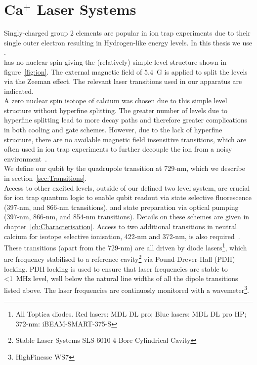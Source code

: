 \section{Ca$^+$ Laser Systems}	
\label{sec:Laser systems}

    Singly-charged group 2 elements are popular in ion trap
    experiments due to their single outer electron resulting in Hydrogen-like
    energy levels. In this thesis we use \ca.\\
    \ca has
    no nuclear spin giving the
    (relatively) simple level structure shown in figure~\ref{fig:ion}. The external
    magnetic field of $5.4$~G is applied to split the levels via the Zeeman
    effect. The relevant laser transitions used in our apparatus are indicated.\\
    A zero nuclear spin isotope of calcium was chosen due to this simple level
    structure without hyperfine splitting. The greater number of levels due to
    hyperfine splitting lead to more decay paths and therefore greater
    complications in both cooling and gate schemes. However, due to the lack of hyperfine structure, there are no available magnetic field insensitive transitions, which are
    often used in ion trap experiments to further decouple the ion from a noisy
    environment~\cite{}. \\
    We define our qubit by the quadrupole transition at 729-nm, which we describe in section~\ref{sec:Transitions}.\\
    Access to other excited levels, outside of our defined two level system, are crucial for ion trap quantum logic to enable qubit readout via state selective fluorescence (397-nm, and 866-nm transitions), and state preparation via optical pumping (397-nm, 866-nm, and 854-nm transitions). Details on these schemes are given in chapter~\ref{ch:Characterisation}. Access to two additional transitions in neutral calcium for isotope selective ionisation, 422-nm and 372-nm, is also required~\cite{}.\\
    These transitions (apart from the 729-nm) are all driven by diode lasers\footnote{All Toptica diodes. Red lasers: MDL DL pro; Blue lasers: MDL DL pro HP; 372-nm: iBEAM-SMART-375-S}, which are frequency stabilised to a reference cavity\footnote{Stable Laser Systems SLS-6010 4-Bore Cylindrical Cavity} via Pound-Drever-Hall (PDH) locking.  PDH locking is used to ensure that laser frequencies are stable to <1~MHz level, well below the natural line widths of all the dipole transitions listed above. The laser frequencies are continuosly monitored with a wavemeter\footnote{HighFinesse WS7}.\\
